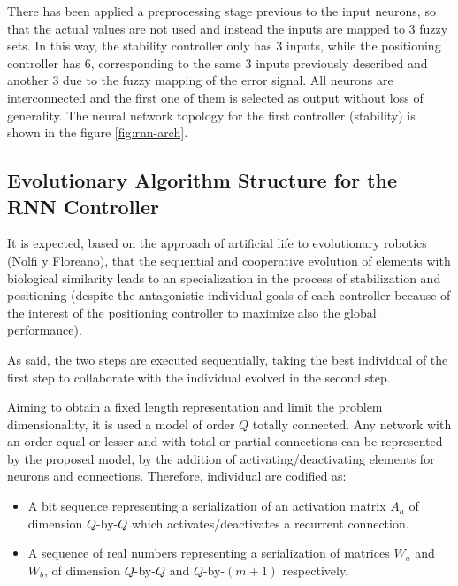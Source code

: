 There has been applied a preprocessing stage previous to the input
neurons, so that the actual values are not used and instead the inputs
are mapped to 3 fuzzy sets. In this way, the stability controller only
has 3 inputs, while the positioning controller has 6, corresponding to
the same 3 inputs previously described and another 3 due to the fuzzy
mapping of the error signal. All neurons are interconnected and the
first one of them is selected as output without loss of
generality. The neural network topology for the first controller
(stability) is shown in the figure \ref{fig:rnn-arch}.


\subsection{Evolutionary Algorithm Structure for the RNN Controller}
It is expected, based on the approach of artificial life to
evolutionary robotics (Nolfi y Floreano), that the sequential and
cooperative evolution of elements with biological similarity leads to
an specialization in the process of stabilization and positioning
(despite the antagonistic individual goals of each controller because of the
interest of the positioning controller to maximize also the global
performance).

As said, the two steps are executed sequentially, taking the best
individual of the first step to collaborate with the individual
evolved in the second step. 

Aiming to obtain a fixed length representation and limit the problem
dimensionality, it is used a model of order $Q$ totally connected. Any
network with an order equal or lesser and with total or partial
connections can be represented by the proposed model, by the addition
of activating/deactivating elements for neurons and
connections. Therefore, individual are codified as: 

\begin{itemize}
 \item A bit sequence representing a serialization of an activation matrix
   $A_a$ of dimension $Q$-by-$Q$ which activates/deactivates a
   recurrent connection.
 \item A sequence of real numbers representing a serialization of
   matrices $W_a$ and $W_b$, of dimension $Q$-by-$Q$ and
   $Q$-by-$(m+1)$ respectively.
\end{itemize}


